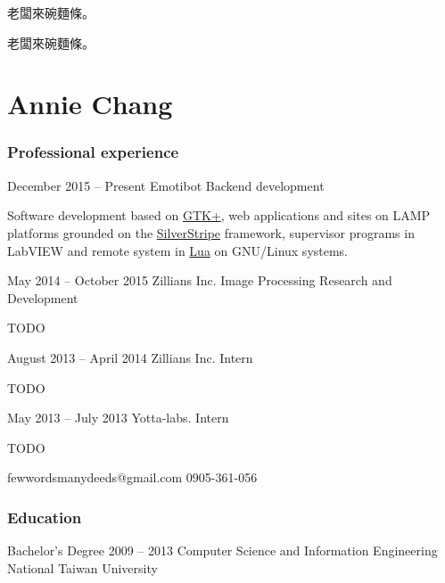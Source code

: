 \documentclass{tccv}
\begin{document}
\begin{CJK*}{UTF8}{bsmi}
老闆來碗麵條。

{老闆來碗麵條。}
\clearpage\end{CJK*}

\part{Annie Chang}

\section{Professional experience}

\begin{eventlist}

\item{December 2015 -- Present}
     {Emotibot} %
     {Backend development}

Software development based on \href{http://www.gtk.org/}{GTK+},
web applications and sites on LAMP platforms grounded on the
\href{http://www.silverstripe.org/}{SilverStripe} framework,
supervisor programs in LabVIEW and remote system in
\href{http://www.lua.org/}{Lua} on GNU/Linux systems.

\item{May 2014 -- October 2015}
     {Zillians Inc.}
     {Image Processing Research and Development}

TODO

\item{August 2013 -- April 2014}
     {Zillians Inc.}
     {Intern}

TODO

\item{May 2013 -- July 2013}
     {Yotta-labs.}
     {Intern}

TODO

\end{eventlist}

\personal
    {fewwordsmanydeeds@gmail.com}
    {0905-361-056}
    {}
    {}

\section{Education}

\begin{yearlist}

\item[Bachelor's Degree]{2009 -- 2013}
     {Computer Science and Information Engineering}
     {National Taiwan University}

\end{yearlist}
\end{document}
